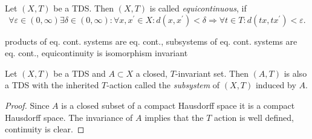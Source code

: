 \begin{definition}
  Let $(X,T)$ be a TDS.
  Then $(X,T)$ is called \emph{equicontinuous}, if
  \begin{equation*}
  \forall \varepsilon \in (0, \infty) \exists \delta \in (0, \infty): \forall x , x^\prime \in X :  d(x, x^\prime) <\delta  \Rightarrow \forall t \in T: d(tx,tx^\prime) < \varepsilon.
  \end{equation*}
\end{definition}

\begin{proposition}
  products of eq. cont. systems are eq. cont., subsystems of eq. cont. systems are eq. cont., equicontinuity is isomorphism invariant
\end{proposition}


\begin{proposition}[Subsystem]
  Let $(X,T)$ be a TDS and $A \subset X$ a closed, $T$-invariant set.
  Then $(A,T)$ is also a TDS with the inherited $T$-action called the \emph{subsystem} of $(X,T)$ induced by $A$.
\end{proposition}
\begin{proof}
  Since $A$ is a closed subset of a compact Hausdorff space it is a compact Hausdorff space. The invariance of $A$ implies that the $T$ action is well defined, continuity is clear. 
\end{proof}

